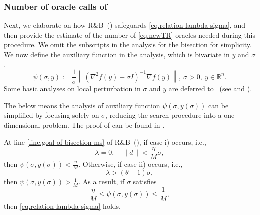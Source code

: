 \documentclass{article}
\begin{document}
\subsubsection{Number of oracle calls of }\label{sec.validty of bisection}
Next, we elaborate on how R\&B~() safeguards \eqref{eq.relation lambda sigma}, and then provide the estimate of the number of \ref{eq.newTR} oracles needed during this procedure. We omit the subscripts in the analysis for the bisection for simplicity. We now define the auxiliary function in the analysis, which is bivariate in $y$ and $\sigma$.
\begin{equation}
    \label{eq.linesearch quantity}
    \psi(\sigma,y) := \frac{1}{\sigma}\left \| \left(\nabla^2 f(y)+\sigma I \right)^{-1}\nabla f(y)\right \|, \ \sigma>0, \ y\in\mathbb{R}^n.
\end{equation}
Some basic analyses on local perturbation in $\sigma$ and $y$ are deferred to ~(see  and ).

The below  means the analysis of auxiliary function $\psi(\sigma,y(\sigma))$ can be simplified by focusing solely on $\sigma$, reducing the search procedure into a one-dimensional problem. The proof of  can be found in .
\begin{lemma}
    \label{lem.reduce line search}
    At line \ref{line.goal of bisection ms} of \textnormal{R\&B}~(), if case i) occurs, i.e.,
    \begin{equation}
        \label{eq.bracket small lambda}
        \lambda = 0, \quad \|d\|<\frac{\eta}{M}\sigma,
    \end{equation}
    then $\psi(\sigma,y(\sigma))<\frac{\eta}{M}$.  Otherwise, if case ii) occurs, i.e.,
    \begin{equation}
        \label{eq.bracket big lambda}
        \lambda > (\theta-1)\sigma,
    \end{equation}
    then $\psi(\sigma,y(\sigma))>\frac{1}{M}$. As a result, if $\sigma$ satisfies
    \begin{equation}
        \label{eq.reduce line search interval}
        \frac{\eta}{M}\leq \psi(\sigma,y(\sigma)) \leq \frac{1}{M},
    \end{equation}
    then \eqref{eq.relation lambda sigma} holds.
\end{lemma}
\end{document}
